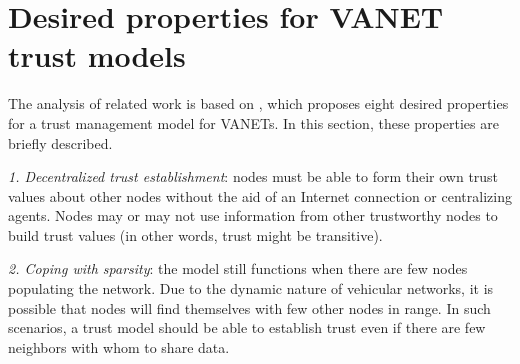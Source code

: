
\section{Desired properties for VANET trust models}
\label{section:properties}

The analysis of related work is based on \citep{zhang2011survey}, which proposes eight desired properties for a trust management model for VANETs.
In this section, these properties are briefly described.

\textit{1. Decentralized trust establishment}: nodes must be able to form their own trust values about other nodes without the aid of an Internet connection or centralizing agents.
Nodes may or may not use information from other trustworthy nodes to build trust values (in other words, trust might be transitive).

\textit{2. Coping with sparsity}: the model still functions when there are few nodes populating the network.
Due to the dynamic nature of vehicular networks, it is possible that nodes will find themselves with few other nodes in range.
In such scenarios, a trust model should be able to establish trust even if there are few neighbors with whom to share data.

